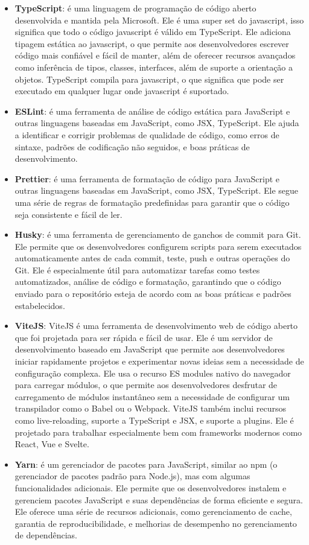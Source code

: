\begin{itemize}
    \item \textbf{TypeScript}: é uma linguagem de programação de código aberto desenvolvida e mantida pela Microsoft. Ele é uma super set do javascript, isso significa que todo o código javascript é válido em TypeScript. Ele adiciona tipagem estática ao javascript, o que permite aos desenvolvedores escrever código mais confiável e fácil de manter, além de oferecer recursos avançados como inferência de tipos, classes, interfaces, além de suporte a orientação a objetos. TypeScript compila para javascript, o que significa que pode ser executado em qualquer lugar onde javascript é suportado.
    \item \textbf{ESLint}: é uma ferramenta de análise de código estática para JavaScript e outras linguagens baseadas em JavaScript, como JSX, TypeScript. Ele ajuda a identificar e corrigir problemas de qualidade de código, como erros de sintaxe, padrões de codificação não seguidos, e boas práticas de desenvolvimento.
    \item \textbf{Prettier}: é uma ferramenta de formatação de código para JavaScript e outras linguagens baseadas em JavaScript, como JSX, TypeScript. Ele segue uma série de regras de formatação predefinidas para garantir que o código seja consistente e fácil de ler.
    \item \textbf{Husky}: é uma ferramenta de gerenciamento de ganchos de commit para Git. Ele permite que os desenvolvedores configurem scripts para serem executados automaticamente antes de cada commit, teste, push e outras operações do Git. Ele é especialmente útil para automatizar tarefas como testes automatizados, análise de código e formatação, garantindo que o código enviado para o repositório esteja de acordo com as boas práticas e padrões estabelecidos.
    \item \textbf{ViteJS}: ViteJS é uma ferramenta de desenvolvimento web de código aberto que foi projetada para ser rápida e fácil de usar. Ele é um servidor de desenvolvimento baseado em JavaScript que permite aos desenvolvedores iniciar rapidamente projetos e experimentar novas ideias sem a necessidade de configuração complexa. Ele usa o recurso ES modules nativo do navegador para carregar módulos, o que permite aos desenvolvedores desfrutar de carregamento de módulos instantâneo sem a necessidade de configurar um transpilador como o Babel ou o Webpack. ViteJS também inclui recursos como live-reloading, suporte a TypeScript e JSX, e suporte a plugins. Ele é projetado para trabalhar especialmente bem com frameworks modernos como React, Vue e Svelte.
    \item \textbf{Yarn}: é um gerenciador de pacotes para JavaScript, similar ao npm (o gerenciador de pacotes padrão para Node.js), mas com algumas funcionalidades adicionais. Ele permite que os desenvolvedores instalem e gerenciem pacotes JavaScript e suas dependências de forma eficiente e segura. Ele oferece uma série de recursos adicionais, como gerenciamento de cache, garantia de reproducibilidade, e melhorias de desempenho no gerenciamento de dependências.
\end{itemize}
